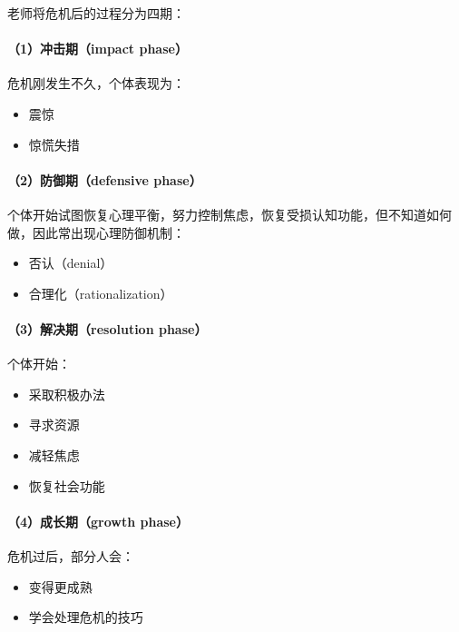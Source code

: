 \documentclass[
  chinese,
  9pt,
  a4paper,
]{ctexart}
\providecommand{\tightlist}{%
  \setlength{\itemsep}{0pt}\setlength{\parskip}{0pt}}
\begin{document}
老师将危机后的过程分为四期：

\paragraph{（1）冲击期（impact
phase）}\label{ux51b2ux51fbux671fimpact-phase}

危机刚发生不久，个体表现为：

\begin{itemize}
\tightlist
\item
  震惊
\item
  惊慌失措
\end{itemize}

\paragraph{（2）防御期（defensive
phase）}\label{ux9632ux5fa1ux671fdefensive-phase}

个体开始试图恢复心理平衡，努力控制焦虑，恢复受损认知功能，但不知道如何做，因此常出现心理防御机制：

\begin{itemize}
\tightlist
\item
  否认（denial）
\item
  合理化（rationalization）
\end{itemize}

\paragraph{（3）解决期（resolution
phase）}\label{ux89e3ux51b3ux671fresolution-phase}

个体开始：

\begin{itemize}
\tightlist
\item
  采取积极办法
\item
  寻求资源
\item
  减轻焦虑
\item
  恢复社会功能
\end{itemize}

\paragraph{（4）成长期（growth
phase）}\label{ux6210ux957fux671fgrowth-phase}

危机过后，部分人会：

\begin{itemize}
\tightlist
\item
  变得更成熟
\item
  学会处理危机的技巧
\end{itemize}
\end{document}

